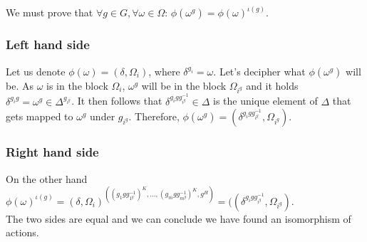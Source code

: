 \documentclass{article}
\begin{document}
\noindent We must prove that $\forall g \in G, \forall \omega \in \Omega$:
$\phi(\omega^g) = \phi(\omega)^{\iota(g)}$.
\subsubsection*{Left hand side}
Let us denote $\phi(\omega) = (\delta, \Omega_i)$, where $\delta^{g_i} = \omega$.
Let's decipher what $\phi(\omega^g)$ will be. As $\omega$ is in the block $\Omega_i$, $\omega^g$ will be in the block $\Omega_{i^g}$ and it holds $\delta^{g_i g} = \omega^g \in \Delta^{g_{i^g}}$. It then follows that $\delta^{g_i g g_{i^g}^{-1}} \in \Delta$ is the unique element of $\Delta$ that gets mapped to $\omega^g$ under $g_{i^g}$. Therefore, $\phi(\omega^g) = (\delta^{g_i g g_{i^g}^{-1}},\Omega_{i^g})$. 
\subsubsection*{Right hand side}
On the other hand $\phi(\omega)^{\iota(g)} = (\delta,\Omega_i)^{((g_1 g g_{1^g}^{-1})^K,\dots, (g_m g g_{m^g}^{-1})^K, g^H)} = ((\delta^{g_i g g_{i^g}^{-1}}, \Omega_{i^g})$.
\\

\noindent The two sides are equal and we can conclude we have found an isomorphism of actions.
\end{document}
